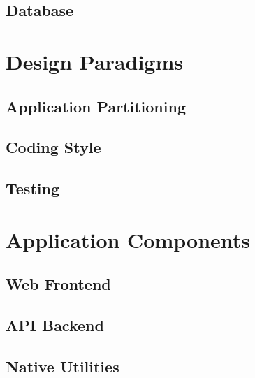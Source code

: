 \subsection{Database}

\section{Design Paradigms}

\subsection{Application Partitioning}

\subsection{Coding Style}

\subsection{Testing}

\section{Application Components}

\subsection{Web Frontend}

\subsection{API Backend}

\subsection{Native Utilities}
